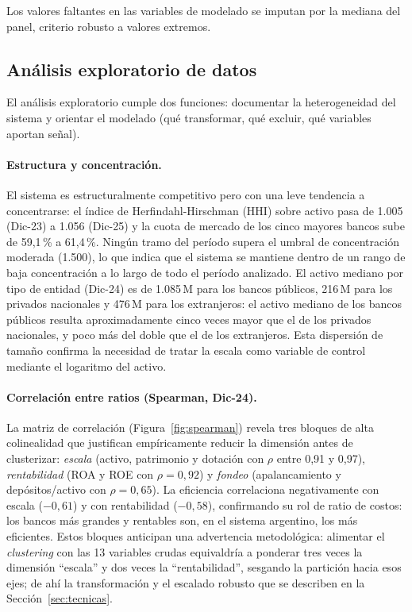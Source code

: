 \documentclass[11pt,a4paper]{article}
\begin{document}
Los valores faltantes en las variables de modelado se imputan por la mediana del panel, criterio robusto
a valores extremos.

\subsection{Análisis exploratorio de datos}

El análisis exploratorio cumple dos funciones: documentar la heterogeneidad del sistema y orientar el
modelado (qué transformar, qué excluir, qué variables aportan señal).

\paragraph{Estructura y concentración.} El sistema es estructuralmente competitivo pero con una leve tendencia a concentrarse: el índice de
Herfindahl-Hirschman (HHI) sobre activo pasa de 1.005 (Dic-23) a 1.056 (Dic-25) y la cuota de mercado
de los cinco mayores bancos sube de 59,1\,\% a 61,4\,\%. Ningún tramo del período supera el umbral de
concentración moderada (1.500), lo que indica que el sistema se mantiene dentro de un rango de baja
concentración a lo largo de todo el período analizado. El activo mediano por tipo de entidad (Dic-24)
es de 1.085\,M para los bancos públicos, 216\,M para los privados nacionales y 476\,M para los
extranjeros: el activo mediano de los bancos públicos resulta aproximadamente cinco veces mayor que
el de los privados nacionales, y poco más del doble que el de los extranjeros. Esta dispersión
de tamaño confirma la necesidad de tratar la escala como variable de control mediante el logaritmo
del activo.

\paragraph{Correlación entre ratios (Spearman, Dic-24).} La matriz de correlación
(Figura~\ref{fig:spearman}) revela tres bloques de alta colinealidad que justifican empíricamente reducir
la dimensión antes de clusterizar: \textit{escala} (activo, patrimonio y dotación con $\rho$ entre 0,91 y
0,97), \textit{rentabilidad} (ROA y ROE con $\rho = 0{,}92$) y \textit{fondeo} (apalancamiento y
depósitos/activo con $\rho = 0{,}65$). La eficiencia correlaciona negativamente con escala ($-0{,}61$) y
con rentabilidad ($-0{,}58$), confirmando su rol de ratio de costos: los bancos más grandes y rentables
son, en el sistema argentino, los más eficientes. Estos bloques anticipan una advertencia metodológica:
alimentar el \textit{clustering} con las 13 variables crudas equivaldría a ponderar tres veces la
dimensión ``escala'' y dos veces la ``rentabilidad'', sesgando la partición hacia esos ejes; de ahí la
transformación y el escalado robusto que se describen en la Sección~\ref{sec:tecnicas}.
\end{document}
